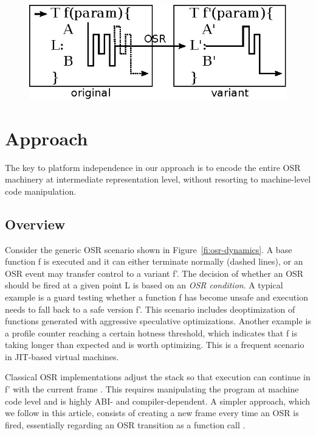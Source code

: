 
\ifdefined\noauthorea
\begin{figure}[t]
\begin{center}
\includegraphics[width=0.6\columnwidth]{figures/overview-osr/overview-osr.eps}
\caption{\protect}
\end{center}
\end{figure}
\fi

\section{Approach}
\label{se:approach}

The key to platform independence in our approach is to encode the entire OSR machinery at intermediate representation level, without resorting to machine-level code manipulation.

\subsection{Overview}
\label{ss:overview}

Consider the generic OSR scenario shown in Figure~\ref{fi:osr-dynamics}. A base function \textsf{f} is executed and it can either terminate normally (dashed lines), or an OSR event may transfer control to a variant \textsf{f'}. The decision of whether an OSR should be fired at a given point \textsf{L} is based on an {\em OSR condition}. A typical example is a guard testing whether a function \textsf{f} has become unsafe and execution needs to fall back to a safe version \textsf{f'}. This scenario includes deoptimization of functions generated with aggressive speculative optimizations. Another example is a profile counter reaching a certain hotness threshold, which indicates that \textsf{f} is taking longer than expected and is worth optimizing. This is a frequent scenario in JIT-based virtual machines.

Classical OSR implementations adjust the stack so that execution can continue in \textsf{f'} with the current frame . This requires manipulating the program at machine code level and is highly ABI- and compiler-dependent. A simpler approach, which we follow in this article, consists of creating a new frame every time an OSR is fired, essentially regarding an OSR transition as a function call . 

